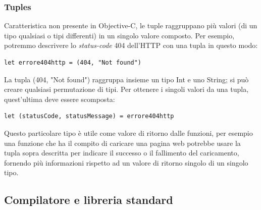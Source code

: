 \subsubsection{Tuples}
Caratteristica non presente in Objective-C, le tuple raggruppano più valori (di un tipo qualsiasi o tipi differenti) in un singolo valore composto. Per esempio, potremmo descrivere lo \textit{status-code} 404 dell'HTTP con una tupla in questo modo:
\lstset{language=[Objective]C, breakindent=40pt, breaklines}
\begin{lstlisting}
let errore404http = (404, "Not found")
\end{lstlisting}
La tupla (404, "Not found") raggruppa insieme un tipo Int e uno String; si può creare qualsiasi permutazione di tipi. Per ottenere i singoli valori da una tupla, quest'ultima deve essere scomposta:
\lstset{language=[Objective]C, breakindent=40pt, breaklines}
\begin{lstlisting}
let (statusCode, statusMessage) = errore404http
\end{lstlisting}
Questo particolare tipo è utile come valore di ritorno dalle funzioni, per esempio una funzione che ha il compito di caricare una pagina web potrebbe usare la tupla sopra descritta per indicare il successo o il fallimento del caricamento, fornendo più informazioni rispetto ad un valore di ritorno singolo di un singolo tipo. 
\subsection{Compilatore e libreria standard}
